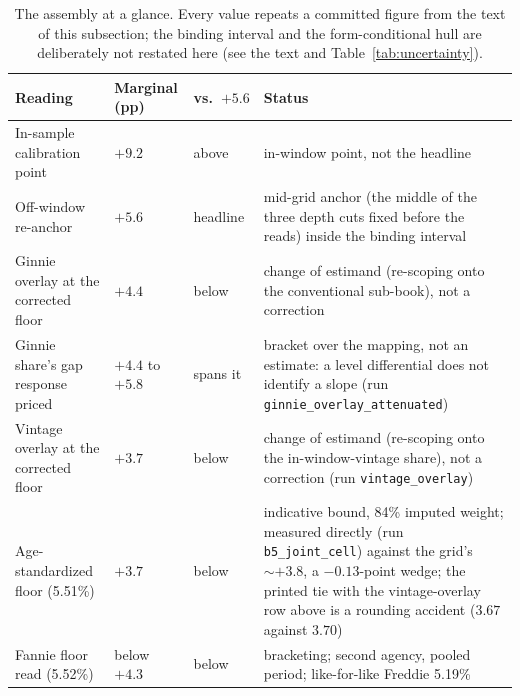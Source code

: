 \documentclass[12pt]{article}
\begin{document}
\begin{table}[!t]
\centering
\caption{The assembly at a glance. Every value repeats a committed figure from the text of this subsection; the binding interval and the form-conditional hull are deliberately not restated here (see the text and Table~\ref{tab:uncertainty}).}
\label{tab:assembly}
\footnotesize
\begin{tabular}{@{}p{3.1cm}p{2.6cm}p{2.4cm}p{7.7cm}@{}}
\toprule
Reading & Marginal (pp) & vs.\ $+5.6$ & Status \\
\midrule
In-sample calibration point & $+9.2$ & above & in-window point, not the headline \\
Off-window re-anchor & $+5.6$ & headline & mid-grid anchor (the middle of the three depth cuts fixed before the reads) inside the binding interval \\
Ginnie overlay at the corrected floor & $+4.4$ & below & change of estimand (re-scoping onto the conventional sub-book), not a correction \\
Ginnie share's gap response priced & $+4.4$ to $+5.8$ & spans it & bracket over the mapping, not an estimate: a level differential does not identify a slope (run \texttt{ginnie\_overlay\_attenuated}) \\ Vintage overlay at the corrected floor & $+3.7$ & below & change of estimand (re-scoping onto the in-window-vintage share), not a correction (run \texttt{vintage\_overlay}) \\
Age-standardized floor (5.51\%) & $+3.7$ & below & indicative bound, 84\% imputed weight; measured directly (run \texttt{b5\_joint\_cell}) against the grid's $\sim +3.8$, a $-0.13$-point wedge; the printed tie with the vintage-overlay row above is a rounding accident ($3.67$ against $3.70$) \\
Fannie floor read (5.52\%) & below $+4.3$ & below & bracketing; second agency, pooled period; like-for-like Freddie 5.19\% \\

\end{tabular}
\end{table}
\end{document}
